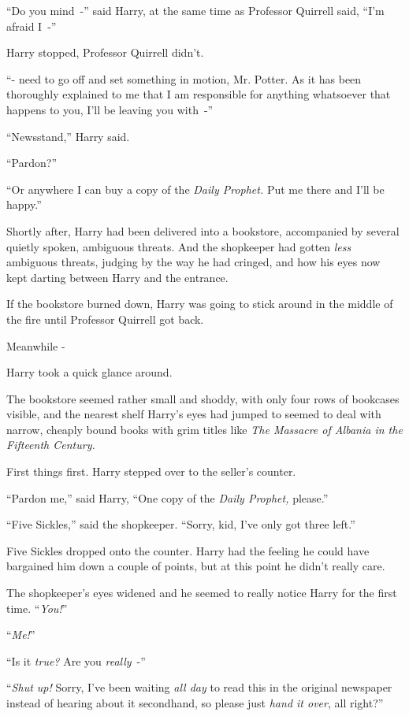 ``Do you mind~-'' said Harry, at the same time as Professor Quirrell said, ``I'm afraid I~-''

Harry stopped, Professor Quirrell didn't.

``- need to go off and set something in motion, Mr. Potter. As it has been thoroughly explained to me that I am responsible for anything whatsoever that happens to you, I'll be leaving you with~-''

``Newsstand,'' Harry said.

``Pardon?''

``Or anywhere I can buy a copy of the \emph{Daily Prophet.} Put me there and I'll be happy.''

Shortly after, Harry had been delivered into a bookstore, accompanied by several quietly spoken, ambiguous threats. And the shopkeeper had gotten \emph{less} ambiguous threats, judging by the way he had cringed, and how his eyes now kept darting between Harry and the entrance.

If the bookstore burned down, Harry was going to stick around in the middle of the fire until Professor Quirrell got back.

Meanwhile -

Harry took a quick glance around.

The bookstore seemed rather small and shoddy, with only four rows of bookcases visible, and the nearest shelf Harry's eyes had jumped to seemed to deal with narrow, cheaply bound books with grim titles like \emph{The Massacre of Albania in the Fifteenth Century.}

First things first. Harry stepped over to the seller's counter.

``Pardon me,'' said Harry, ``One copy of the \emph{Daily Prophet,} please.''

``Five Sickles,'' said the shopkeeper. ``Sorry, kid, I've only got three left.''

Five Sickles dropped onto the counter. Harry had the feeling he could have bargained him down a couple of points, but at this point he didn't really care.

The shopkeeper's eyes widened and he seemed to really notice Harry for the first time. ``\emph{You!}''

``\emph{Me!}''

``Is it \emph{true?} Are you \emph{really}~-''

``\emph{Shut up!} Sorry, I've been waiting \emph{all day} to read this in the original newspaper instead of hearing about it secondhand, so please just \emph{hand it over}, all right?''

